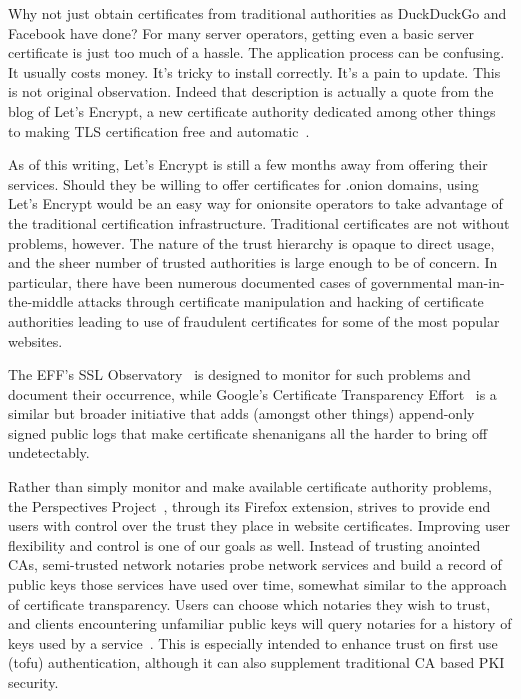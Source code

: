 \documentclass[10pt, conference, compsocconf]{styles/IEEEtran}
\begin{document}
Why not just obtain certificates from traditional authorities as
DuckDuckGo and Facebook have done? For many server operators, getting
even a basic server certificate is just too much of a hassle. The
application process can be confusing. It usually costs money. It's
tricky to install correctly. It's a pain to update. This is not
original observation. Indeed that description is actually a quote from
the blog of Let's Encrypt, a new certificate authority dedicated among
other things to making TLS certification free and automatic~\cite
{lets-encrypt}.

As of this writing, Let's Encrypt is still a few months away from
offering their services.  Should they be willing to offer certificates
for .onion domains, using Let's Encrypt would be an easy way for
onionsite operators to take advantage of the traditional certification
infrastructure. Traditional certificates are not without problems,
however. The nature of the trust hierarchy is opaque to direct usage,
and the sheer number of trusted authorities is large enough to be of
concern. In particular, there have been numerous documented cases of
governmental man-in-the-middle attacks through certificate
manipulation and hacking of certificate authorities leading to use of
fraudulent certificates for some of the most popular websites.

The EFF's SSL Observatory~\cite{ssl-observatory} is designed to
monitor for such problems and document their occurrence, while
Google's Certificate Transparency Effort~\cite{certificate-
transparency} is a similar but broader initiative that adds (amongst
other things) append-only signed public logs that make certificate
shenanigans all the harder to bring off undetectably.

Rather than simply monitor and make available certificate authority
problems, the Perspectives Project~\cite{perspectives}, through its
Firefox extension, strives to provide end users with control over the
trust they place in website certificates. Improving user flexibility
and control is one of our goals as well. Instead of trusting anointed
CAs, semi-trusted network notaries probe network services and build a
record of public keys those services have used over time, somewhat
similar to the approach of certificate transparency. Users can choose
which notaries they wish to trust, and clients encountering unfamiliar
public keys will query notaries for a history of keys used by a
service~\cite{perspectives-paper}. This is especially intended to
enhance trust on first use (tofu) authentication, although it can also
supplement traditional CA based PKI security.
\end{document}

